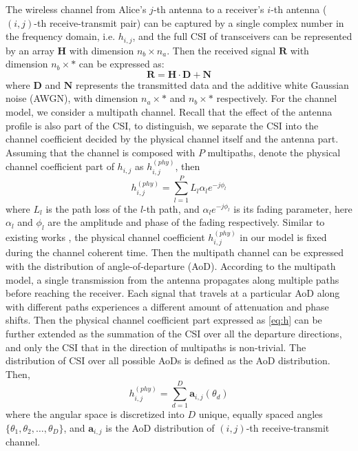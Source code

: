 The wireless channel from Alice's $j$-th antenna to a receiver's $i$-th antenna ($(i,j)$-th receive-transmit pair) can be captured by a single complex number in the frequency domain, i.e. $h_{i,j}$, and the full CSI of transceivers can be represented by an array $\mathbf{H}$ with dimension  $n_b \times n_a$. Then the received signal $\mathbf{R}$ with dimension $n_b \times *$ can be expressed as:
\begin{equation}
    \mathbf{R} = \mathbf{H} \cdot \mathbf{D} + \mathbf{N}
\end{equation}
where $\mathbf{D}$ and $\mathbf{N}$ represents the transmitted data and the additive white Gaussian noise (AWGN), with dimension $n_a \times *$ and $n_b \times *$ respectively.
For the channel model, we consider a multipath channel. Recall that the effect of the antenna profile is also part of the CSI, to distinguish, we separate the CSI into the channel coefficient decided by the physical channel itself and the antenna part. Assuming that the channel is composed with $P$ multipaths, denote the physical channel coefficient part of $h_{i,j}$ as $h_{i,j}^{(phy)}$, then
\begin{equation}
    h_{i,j}^{(phy)}=\sum\limits_{l=1}^{P}L_{l}\alpha_{l}e^{-j\phi_{l}}
   \label{eq:h}
\end{equation}
where $L_{l}$ is the path loss of the $l$-th path, and $\alpha_{l}e^{-j\phi_{l}}$ is its fading parameter, here $\alpha_{l}$ and $\phi_{l}$ are the amplitude and phase of the fading respectively. Similar to existing works \cite{anand2012strobe,schulz2014practical,zheng2016profiling}, the physical channel coefficient $ h_{i,j}^{(phy)}$ in our model is fixed during the channel coherent time. Then the multipath channel can be expressed with the distribution of angle-of-departure (AoD). According to the multipath model, a single transmission from the antenna propagates along multiple paths before reaching the receiver. Each signal that travels at a particular AoD along with different paths experiences a different amount of attenuation and phase shifts. Then the physical channel coefficient part expressed as  \eqref{eq:h} can be further extended as the summation of the CSI over all the departure directions, and only the CSI that in the direction of multipaths is non-trivial. The distribution of CSI over all possible AoDs is defined as the AoD distribution. Then,
\begin{equation}
    h_{i,j}^{(phy)}=\sum\limits_{d=1}^{D}\mathbf{a}_{i,j}(\theta_d)
   \label{eq:h2}
\end{equation}
where the angular space is discretized into $D$ unique, equally spaced angles $\{\theta_1,\theta_2, \dots, \theta_D \}$, and $\mathbf{a}_{i,j}$ is the AoD distribution of $(i,j)$-th receive-transmit channel.

